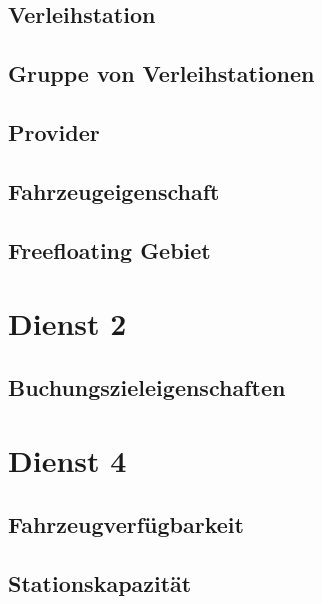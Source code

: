 \subsection*{Verleihstation}


\subsection*{Gruppe von Verleihstationen}


\subsection*{Provider}



\subsection*{Fahrzeugeigenschaft}


\subsection*{Freefloating Gebiet}


\section{Dienst 2}
\label{subsec:Datenmodell:Dienst2}

\subsection*{Buchungszieleigenschaften}





\section{Dienst 4}
\label{subsec:Datenmodell:Dienst4}

\subsection*{Fahrzeugverfügbarkeit}


\subsection*{Stationskapazität}



